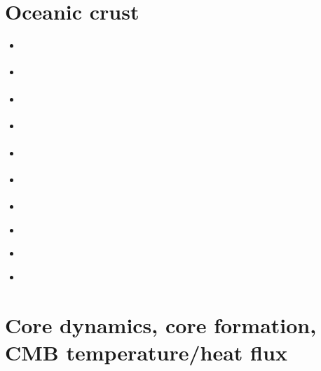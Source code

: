 \section{Oceanic crust} 

\begin{scriptsize}
\begin{itemize}
\item[\nineteeneightyeight] 
\textcite{mofo88} 
\item[\nineteenninetyfour] 
\textcite{chho94} 
\item[\nineteenninetysix] 
\textcite{vaky96} 
\item[\twothousandfour] 
\textcite{vavv04b} 
\item[\twothousandseven] 
\textcite{brva07b} 
\item[\twothousandeight] 
\textcite{gomm08} 
\item[\twothousandthirteen] 
\textcite{limc13} \\
\textcite{yosh13} 
\item[\twothousandfifteen] 
\textcite{rula15} 
\item[\twothousandseventeen] 
\textcite{taac17} 
\item[\twothousandtwenty] 
\textcite{mugu20} \\ 
\textcite{yabt20} 
\end{itemize}
\end{scriptsize}


\section{Core dynamics, core formation, CMB temperature/heat flux}

